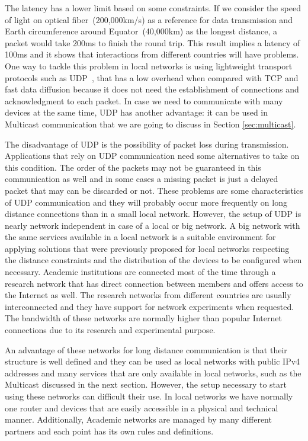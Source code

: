 The latency has a lower limit based on some constraints.
If we consider the speed of light on optical fiber~(200,000km/s) as a reference for data transmission and Earth circumference around Equator~(40,000km) as the longest distance, a packet would take 200ms to finish the round trip.
This result implies a latency of 100ms and it shows that interactions from different countries will have problems.
One way to tackle this problem in local networks is using lightweight transport protocols such as UDP~\citep{Harker2008laptop,Caceres2010jacktrip}, that has a low overhead when compared with TCP and fast data diffusion because it does not need the establishment of connections and acknowledgment to each packet.
In case we need to communicate with many devices at the same time, UDP has another advantage: it can be used in Multicast communication that we are going to discuss in Section \ref{sec:multicast}.   

The disadvantage of UDP is the possibility of packet loss during transmission.
Applications that rely on UDP communication need some alternatives to take on this condition.
The order of the packets may not be guaranteed in this communication as well and in some cases a missing packet is just a delayed packet that may can be discarded or not.
These problems are some characteristics of UDP communication and they will probably occur more frequently on long distance connections than in a small local network.
However, the setup of UDP is nearly network independent in case of a local or big network.
A big network with the same services available in a local network is a suitable environment for applying solutions that were previously proposed for local networks respecting the distance constraints and the distribution of the devices to be configured when necessary.
Academic institutions are connected most of the time through a research network that has direct connection between members and offers access to the Internet as well.
The research networks from different countries are usually interconnected and they have support for network experiments when requested.
The bandwidth of these networks are normally higher than popular Internet connections due to its research and experimental purpose.

An advantage of these networks for long distance communication is that their structure is well defined and they can be used as local networks with public IPv4 addresses and many services that are only available in local networks, such as the Multicast discussed in the next section.
However, the setup necessary to start using these networks can difficult their use.
In local networks we have normally one router and devices that are easily accessible in a physical and technical manner.
Additionally, Academic networks are managed by many different partners and each point has its own rules and definitions.

